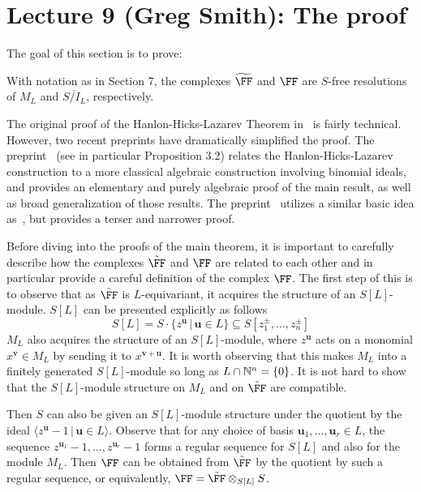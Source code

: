 \documentclass{amsart}
\begin{document}
\section{Lecture 9 (Greg Smith): The proof}\label{lec:9-HHL-proof}
The goal of this section is to prove:

\begin{theorem} \cite{HHL}\label{thm:HHL-resolution}
With notation as in Section 7, the complexes $\tF$ and $\FF$ are $S$-free resolutions of $M_{L}$ and $\overline{S/I_{L}}$, respectively. 
\end{theorem}

The original proof of the Hanlon-Hicks-Lazarev Theorem in~\cite{HHL} is fairly technical.  However, two recent preprints have dramatically simplified the proof.  The preprint~\cite{BCHSY} (see in particular Proposition 3.2) relates the Hanlon-Hicks-Lazarev construction to a more classical algebraic construction involving binomial ideals, and provides an elementary and purely algebraic proof of the main result, as well as broad generalization of those results.  The preprint~\cite{BH25} utilizes a similar basic idea as~\cite{BCHSY}, but provides a terser and narrower proof.

Before diving into the proofs of the main theorem, it is important to carefully describe how the complexes $\tilde \FF$ and $\FF$ are related to each other and in particular provide a careful definition of the complex $\FF$.
The first step of this is to observe that as $\tilde \FF$ is $L$-equivariant, it acquires the structure of an $S[L]$-module. $S[L]$ can be presented explicitly as follows
\[S[L]=S\cdot \{z^{\mathbf{u}} \,|\, \mathbf{u}\in L\}\subseteq S[z_1^{\pm},\ldots,z_n^{\pm}]\]
$M_L$ also acquires the structure of an $S[L]$-module, where $z^{\mathbf{u}}$ acts on a monomial $x^{\mathbf{v}}\in M_L$ by sending it to $x^{\mathbf{v}+\mathbf{u}}$. It is worth observing that this makes $M_L$ into a finitely generated $S[L]$-module so long as $L\cap \mathbb N^n=\{0\}$. It is not hard to show that the $S[L]$-module structure on $M_L$ and on $\tilde \FF$ are compatible.

Then $S$ can also be given an $S[L]$-module structure under the quotient by the ideal $\langle z^{\mathbf{u}}-1 \,|\, \mathbf{u}\in L\rangle$. Observe that for any choice of basis $\mathbf{u}_1,\ldots,\mathbf{u}_r\in L$, the sequence $z^{\mathbf{u}_1}-1,\ldots,z^{\mathbf{u}_r}-1$ forms a regular sequence for $S[L]$ and also for the module $M_L$. Then $\FF$ can be obtained from $\tilde \FF$ by the quotient by such a regular sequence, or equivalently, $\FF = \tilde \FF \otimes_{S[L]} S$.
\end{document}
